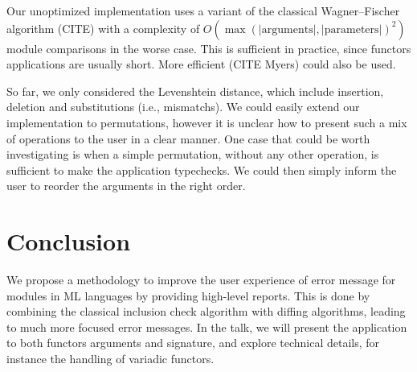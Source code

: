 \documentclass[a4paper,11pt]{scrartcl}
\begin{document}
Our unoptimized implementation uses a variant of the classical
Wagner–Fischer algorithm (CITE) with a complexity of
$O(\max(\mathrm{|arguments|,|parameters|})^2)$ module comparisons in the worse case.
This is sufficient in practice, since functors applications are usually short.
More efficient (CITE Myers) could also be used.

So far, we only considered the Levenshtein distance, which include
insertion, deletion and substitutions (i.e., mismatchs). We could easily extend
our implementation to permutations, however it is unclear how to present
such a mix of operations to the user in a clear manner.
One case that could be worth investigating is when a simple permutation,
without any other operation,
is sufficient to make the application typechecks. We could then simply
inform the user to reorder the arguments in the right order.



\section{Conclusion}

We propose a methodology to improve the user experience of error message for modules in ML languages by providing high-level reports.
This is done by combining the classical
inclusion check algorithm with diffing algorithms, leading to much more
focused error messages.
In the talk, we will present the application to both functors arguments and
signature, and explore technical details, for instance the handling of variadic
functors.
\end{document}
